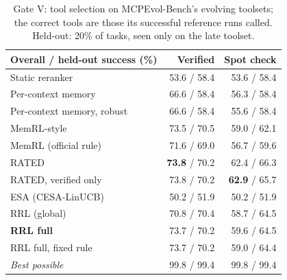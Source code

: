 \begin{table}[H]
\centering
\small
\begin{tabular}{lrr}
\toprule
Overall / held-out success (\%) & Verified & Spot check \\
\midrule
Static reranker & 53.6 / 58.4 & 53.6 / 58.4 \\
Per-context memory & 66.6 / 58.4 & 56.3 / 58.4 \\
Per-context memory, robust & 66.6 / 58.4 & 55.6 / 58.4 \\
MemRL-style & 73.5 / 70.5 & 59.0 / 62.1 \\
MemRL (official rule) & 71.6 / 69.0 & 56.7 / 59.6 \\
RATED & \textbf{73.8} / 70.2 & 62.4 / 66.3 \\
RATED, verified only & 73.8 / 70.2 & \textbf{62.9} / 65.7 \\
ESA (CESA-LinUCB) & 50.2 / 51.9 & 50.2 / 51.9 \\
\midrule
RRL (global) & 70.8 / 70.4 & 58.7 / 64.5 \\
\textbf{RRL full} & 73.7 / 70.2 & 59.6 / 64.5 \\
RRL full, fixed rule & 73.7 / 70.2 & 59.0 / 64.4 \\
\textit{Best possible} & 99.8 / 99.4 & 99.8 / 99.4 \\
\bottomrule
\end{tabular}
\caption{Gate V: tool selection on MCPEvol-Bench's evolving toolsets; the correct tools are those its successful reference runs called. Held-out: 20\% of tasks, seen only on the late toolset.}
\label{tab:gatev}
\end{table}

